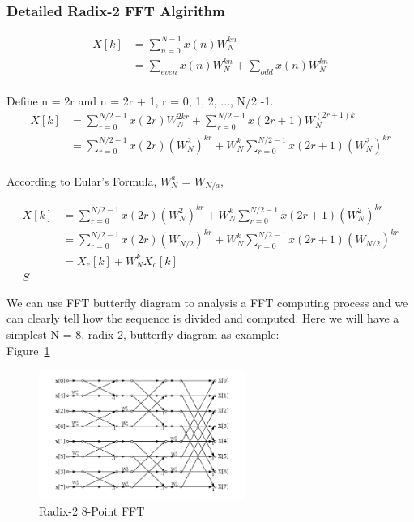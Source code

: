 \documentclass[12pt]{article}
\begin{document}
\subsubsection*{Detailed Radix-2 FFT Algirithm}

\begin{align*}
X[k] &= \sum\limits_{n=0}^{N-1}x(n)W_{N}^{kn}\\
& = \sum\limits_{even}x(n)W_{N}^{kn} + \sum\limits_{odd}x(n)W_{N}^{kn}\\
\end{align*}

Define n = 2r and n = 2r + 1, r = 0, 1, 2, ..., N/2 -1.\\

\begin{align*}
X[k] &= \sum\limits_{r=0}^{N/2 -1}x(2r)W_{N}^{2kr} + \sum\limits_{r=0}^{N/2 -1}x(2r+1)W_{N}^{(2r+ 1)k}\\
& =  \sum\limits_{r=0}^{N/2 -1}x(2r)(W_{N}^{2})^{kr} + W_{N}^{k}\sum\limits_{r=0}^{N/2 -1}x(2r+1)(W_{N}^{2})^{kr}\\
\end{align*}

According to Eular's Formula, $W_{N}^{a}$ = $W_{N/a}$,\\ 

\begin{align*}
X[k] & =  \sum\limits_{r=0}^{N/2 -1}x(2r)(W_{N}^{2})^{kr} + W_{N}^{k}\sum\limits_{r=0}^{N/2 -1}x(2r+1)(W_{N}^{2})^{kr}\\
& = \sum\limits_{r=0}^{N/2 -1}x(2r)(W_{N/2})^{kr} + W_{N}^{k}\sum\limits_{r=0}^{N/2 -1}x(2r+1)(W_{N/2})^{kr}\\
& = X_e[k] + W_N^kX_o[k]\\S
\end{align*}

We can use FFT butterfly diagram to analysis a  FFT computing process and we can clearly tell how the sequence is divided and computed. Here we will have a simplest
N = 8, radix-2, butterfly diagram as example:\\

Figure~\ref{Fig_Radix-2FFT}

\begin{figure}[h!]
\begin{center}
 \includegraphics[width=0.6\textwidth]{butterflyRedix2}
\caption{Radix-2 8-Point FFT}
\label{Fig_Radix-2FFT}
\end{center}
\end{figure}
\end{document}
